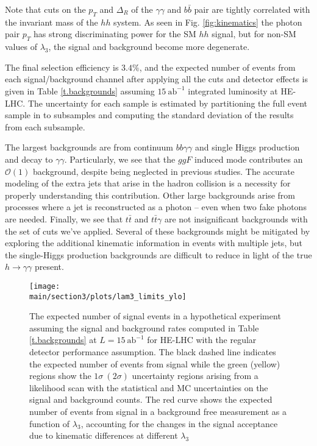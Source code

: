 Note that cuts on the $p_T$ and $\Delta_R$ of the $\gamma\gamma$ and $b\bar{b}$ pair are tightly correlated with the invariant mass of the $hh$ system. As seen in Fig. \ref{fig:kinematics} the photon pair $p_T$ has strong discriminating power for the SM $hh$ signal, but for non-SM values of $\lambda_{3}$, the signal and background become more degenerate.

The final selection efficiency is $3.4 \%$, and the expected number of events from each signal/background channel after applying all the cuts and detector effects is given in Table \ref{t.backgrounds} assuming $15~\text{ab}^{-1}$ integrated luminosity at HE-LHC. The uncertainty for each sample is estimated by partitioning the full event sample in to subsamples and computing the standard deviation of the results from each subsample.

The largest backgrounds are from continuum $bb\gamma\gamma$ and single Higgs production and decay to $\gamma\gamma$. Particularly, we see that the $ggF$ induced mode contributes an $\mathcal{O}(1)$ background, despite being neglected in previous studies. The accurate modeling of the extra jets that arise in the hadron collision is a necessity for properly understanding this contribution.
Other large backgrounds arise from processes where a jet is reconstructed as a photon -- even when two fake photons are needed. Finally, we see that $t\bar{t}$ and $t\bar{t}\gamma$ are not insignificant backgrounds with the set of cuts we've applied. Several of these backgrounds might be mitigated by exploring the additional kinematic information in events with multiple jets, but the single-Higgs production backgrounds are difficult to reduce in light of the true $h\rightarrow \gamma\gamma$ present.

\begin{figure}
	\centering
	\texttt{[image: \\main/section3/plots/lam3\_limits\_ylo]}
	\caption{The expected number of signal events in a hypothetical experiment assuming the signal and background rates computed in Table \ref{t.backgrounds} at $L = 15~\text{ab}^{-1}$ for HE-LHC with the regular detector performance assumption. The black dashed line indicates the expected number of events from signal while the green (yellow) regions show the $1\sigma~(2\sigma)$ uncertainty regions arising from a likelihood scan with the statistical and MC uncertainties on the signal and background counts. The red curve shows the expected number of events from signal in a background free measurement as a function of $\lambda_3$, accounting for the changes in the signal acceptance due to kinematic differences at different $\lambda_3$}\label{fig:lam3_limit}
\end{figure}


